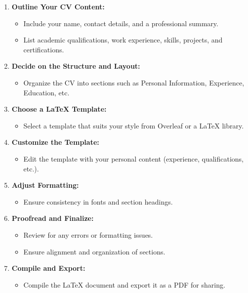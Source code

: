 \documentclass[a4paper,12pt]{article}
\begin{document}
\begin{enumerate}
    \item \textbf{Outline Your CV Content:}
    \begin{itemize}
        \item Include your name, contact details, and a professional summary.
        \item List academic qualifications, work experience, skills, projects, and certifications.
    \end{itemize}

    \item \textbf{Decide on the Structure and Layout:}
    \begin{itemize}
        \item Organize the CV into sections such as Personal Information, Experience, Education, etc.
    \end{itemize}

    \item \textbf{Choose a LaTeX Template:}
    \begin{itemize}
        \item Select a template that suits your style from Overleaf or a LaTeX library.
    \end{itemize}

    \item \textbf{Customize the Template:}
    \begin{itemize}
        \item Edit the template with your personal content (experience, qualifications, etc.).
    \end{itemize}

    \item \textbf{Adjust Formatting:}
    \begin{itemize}
        \item Ensure consistency in fonts and section headings.
    \end{itemize}

    \item \textbf{Proofread and Finalize:}
    \begin{itemize}
        \item Review for any errors or formatting issues.
        \item Ensure alignment and organization of sections.
    \end{itemize}

    \item \textbf{Compile and Export:}
    \begin{itemize}
        \item Compile the LaTeX document and export it as a PDF for sharing.
    \end{itemize}
\end{enumerate}
\end{document}
